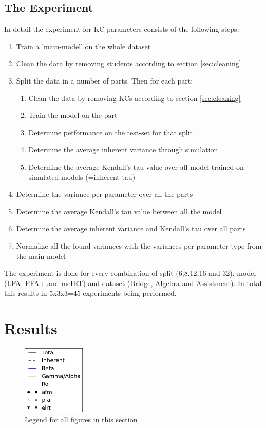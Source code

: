 \documentclass{scrartcl}
\begin{document}
\subsection{The Experiment}
In detail the experiment for KC parameters consists of the following steps:
\begin{enumerate}
\item Train a 'main-model' on the whole dataset
\item Clean the data by removing students according to section \ref{sec:cleaning}
\item Split the data in a number of parts. Then for each part:
\begin{enumerate}
\item Clean the data by removing KCs according to section \ref{sec:cleaning}
\item Train the model on the part
\item Determine performance on the test-set for that split
\item Determine the average inherent variance through simulation
\item Determine the average Kendall's tau value over all model trained on simulated models (=inherent tau)
\end{enumerate}
\item Determine the variance per parameter over all the parts
\item Determine the average Kendall's tau value between all the model
\item Determine the average inherent variance and Kendall's tau over all parts 
\item Normalize all the found variances with the variances per parameter-type from the main-model
\end{enumerate}

The experiment is done for every combination of split (6,8,12,16 and 32), model (LFA, PFA+ and meIRT) and dataset (Bridge, Algebra and Assistment). In total this results in 5x3x3=45 experiments being performed.


\section{Results}

\begin{figure}
\includegraphics[width=30mm]{images/legend.png}
\caption{Legend for all figures in this section}
\label{fig:legend}
\end{figure}
\end{document}
